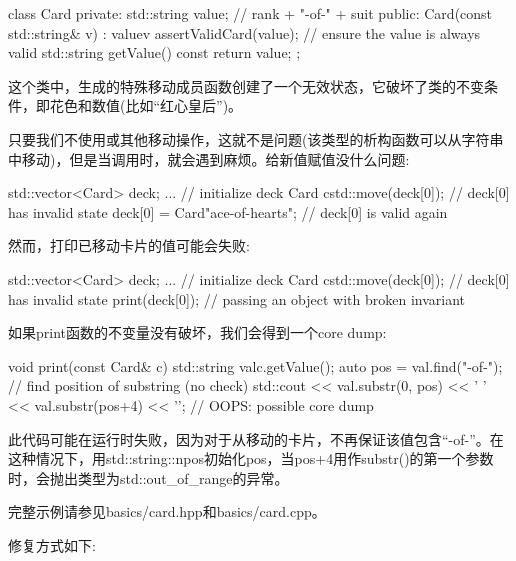 \begin{cppcode}
class Card {
private:
	std::string value; // rank + "-of-" + suit
public:
	Card(const std::string& v)
	: value{v} {
		assertValidCard(value); // ensure the value is always valid
	}
	std::string getValue() const {
		return value;
	}
};
\end{cppcode}

这个类中，生成的特殊移动成员函数创建了一个无效状态，它破坏了类的不变条件，即花色和数值(比如“红心皇后”)。

只要我们不使用或其他移动操作，这就不是问题(该类型的析构函数可以从字符串中移动)，但是当调用时，就会遇到麻烦。给新值赋值没什么问题:

\begin{cppcode}
std::vector<Card> deck;
... // initialize deck
Card c{std::move(deck[0])}; // deck[0] has invalid state
deck[0] = Card{"ace-of-hearts"}; // deck[0] is valid again
\end{cppcode}

然而，打印已移动卡片的值可能会失败:

\begin{cppcode}
std::vector<Card> deck;
... // initialize deck
Card c{std::move(deck[0])}; // deck[0] has invalid state
print(deck[0]); // passing an object with broken invariant
\end{cppcode}

如果print函数的不变量没有破坏，我们会得到一个core dump:

\begin{cppcode}
void print(const Card& c) {
	std::string val{c.getValue()};
	auto pos = val.find("-of-"); // find position of substring (no check)
	std::cout << val.substr(0, pos) << ' '
	<< val.substr(pos+4) << '\n'; // OOPS: possible core dump
}
\end{cppcode}

此代码可能在运行时失败，因为对于从移动的卡片，不再保证该值包含“-of-”。在这种情况下，用std::string::npos初始化pos，当pos+4用作substr()的第一个参数时，会抛出类型为std::out_of_range的异常。

完整示例请参见basics/card.hpp和basics/card.cpp。

修复方式如下:

